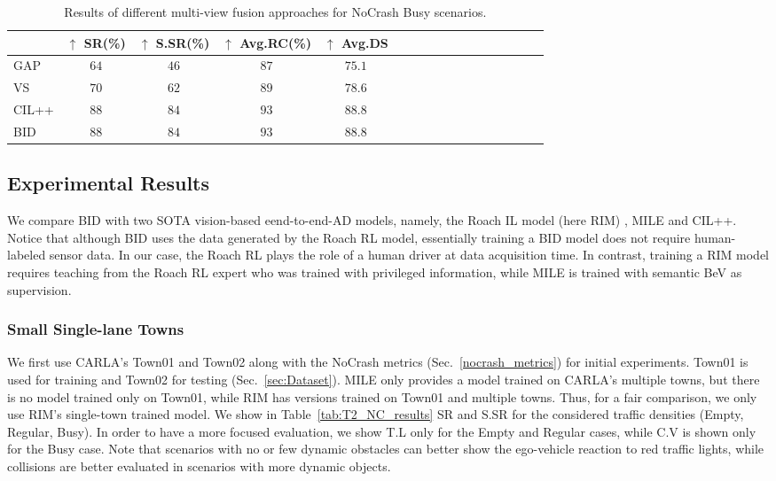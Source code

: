 \begin{table}
	\centering
	\begin{tabular}{@{}lcccccccccccccccc@{}}
		\toprule
		& $\uparrow$ SR(\%) & $\uparrow$ S.SR(\%) & $\uparrow$ Avg.RC(\%) & $\uparrow$ Avg.DS  \\
		\midrule
		GAP & $64$ & $46$ & $87$ & $75.1$  \\
		VS & $70$ & $62$ & $89$ & $78.6$  \\
		CIL++ & $88$ & $84$ & $93$ & $88.8$  \\
		BID & $88$ & $84$ & $93$ & $88.8$  \\ 
		\bottomrule
	\end{tabular}
	\caption{Results of different multi-view fusion approaches for NoCrash Busy scenarios.}
	\label{tab:ablation_study_sa}
\end{table}


\subsection{Experimental Results}
\label{sec:Results}
\hspace{1pc}We compare BID with two SOTA vision-based eend-to-end-AD models, namely, the Roach IL model (here RIM) \cite{Zhang:2021}, MILE \cite{Hu:2022} and CIL++. 
Notice that although BID uses the data generated by the Roach RL model, essentially training a BID model does not require human-labeled sensor data. 
In our case, the Roach RL plays the role of a human driver at data acquisition time. 
In contrast, training a RIM model requires teaching from the Roach RL expert who was trained with privileged information, while MILE is trained with semantic BeV as supervision.


\subsubsection{Small Single-lane Towns} \label{sec:small_town_results}
\hspace{1pc}We first use CARLA's Town01 and Town02 along with the NoCrash metrics (Sec.~\ref{nocrash_metrics}) for initial experiments. 
Town01 is used for training and Town02 for testing (Sec.~\ref{sec:Dataset}). 
MILE only provides a model trained on CARLA's multiple towns, but there is no model trained only on Town01, while RIM has versions trained on Town01 and multiple towns. 
Thus, for a fair comparison, we only use RIM's single-town trained model. 
We show in Table~\ref{tab:T2_NC_results} SR and S.SR for the considered traffic densities (Empty, Regular, Busy). 
In order to have a more focused evaluation, we show T.L only for the Empty and Regular cases, while C.V is shown only for the Busy case. 
Note that scenarios with no or few dynamic obstacles can better show the ego-vehicle reaction to red traffic lights, while collisions are better evaluated in scenarios with more dynamic objects. 


